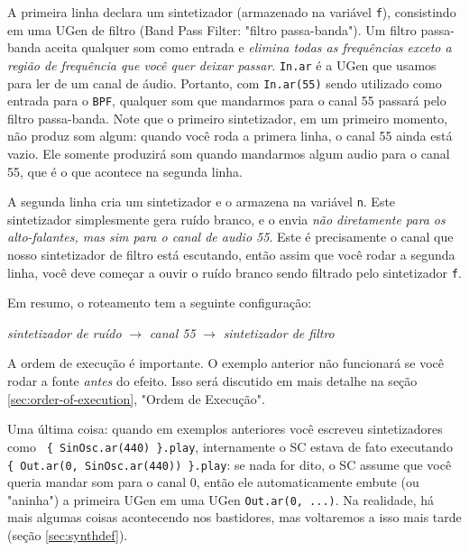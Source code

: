 A primeira linha declara um sintetizador (armazenado na variável \texttt{f}), consistindo em uma UGen de filtro (Band Pass Filter: "filtro passa-banda"). Um filtro passa-banda aceita qualquer som como entrada e \emph{elimina todas as frequências exceto a região de frequência que você quer deixar passar}. \texttt{In.ar} é a UGen que usamos para ler de um canal de áudio. Portanto, com \texttt{In.ar(55)} sendo utilizado como entrada para o \texttt{BPF}, qualquer som que mandarmos para o canal 55 passará pelo filtro passa-banda. Note que o primeiro sintetizador, em um primeiro momento, não produz som algum: quando você roda a primera linha, o canal 55 ainda está vazio. Ele somente produzirá som quando mandarmos algum audio para o canal 55, que é o que acontece na segunda linha.

A segunda linha cria um sintetizador e o armazena na variável \texttt{n}. Este sintetizador simplesmente gera ruído branco, e o envia \emph{não diretamente para os alto-falantes, mas sim para o canal de audio 55}. Este é precisamente o canal que nosso sintetizador de filtro está escutando, então assim que você rodar a segunda linha, você deve começar a ouvir o ruído branco sendo filtrado pelo sintetizador \texttt{f}.

Em resumo, o roteamento tem a seguinte configuração: 

\begin{center}
\emph{sintetizador de ruído} $\rightarrow$ \emph{canal 55} $\rightarrow$ \emph{sintetizador de filtro}
\end{center}

A ordem de execução é importante. O exemplo anterior não funcionará se você rodar a fonte \emph{antes} do efeito. Isso será discutido em mais detalhe na seção \ref{sec:order-of-execution}, "Ordem de Execução".

Uma última coisa: quando em exemplos anteriores você escreveu sintetizadores como \texttt{ \{ SinOsc.ar(440) \}.play}, internamente o SC estava de fato executando \texttt{\{ Out.ar(0, SinOsc.ar(440)) \}.play}: se nada for dito, o SC assume que você queria mandar som para o canal 0, então ele automaticamente embute (ou "aninha") a primeira UGen em uma UGen \texttt{Out.ar(0, ...)}. Na realidade, há mais algumas coisas acontecendo nos bastidores, mas voltaremos a isso mais tarde (seção \ref{sec:synthdef}).
